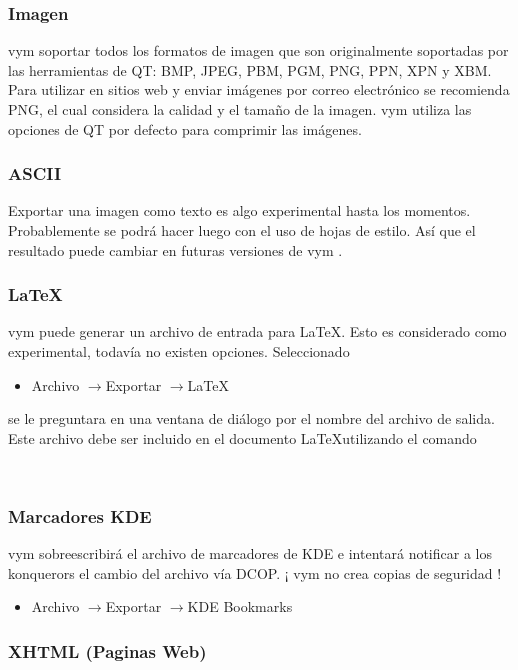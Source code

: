 \documentclass{article}
\newcommand{\vym}{{\sc vym }}
\newcommand{\ra}{$\longrightarrow$}
\begin{document}
\subsubsection*{Imagen}
\vym soportar todos los formatos de imagen que son originalmente soportadas por las herramientas de QT: BMP, JPEG, PBM, PGM, PNG, PPN, XPN y XBM. Para utilizar en sitios web y enviar im\'agenes por correo electr\'onico se recomienda PNG, el cual considera la calidad y el tama\~no de la imagen. \vym utiliza las opciones de QT por defecto para comprimir las im\'agenes.

\subsubsection*{ASCII}
    Exportar una imagen como texto es algo experimental hasta los momentos. Probablemente se podr\'a hacer luego con el uso de hojas de estilo. As\'i que el resultado puede cambiar en futuras versiones de \vym.

\subsubsection*{\LaTeX}
\vym puede generar un archivo de entrada para \LaTeX. Esto es considerado como experimental, todav\'ia no existen opciones. Seleccionado
\begin{itemize}
    \item   Archivo \ra Exportar \ra \LaTeX
\end{itemize}
    se le preguntara en una ventana de di\'alogo por el nombre del archivo de salida. Este archivo debe ser incluido en el documento \LaTeX utilizando el comando
\begin{verbatim}
    
\end{verbatim}

\subsubsection*{Marcadores KDE}
\vym sobreescribir\'a el archivo de marcadores de KDE e intentar\'a notificar a los konquerors el cambio del archivo v\'ia DCOP. 
¡ \vym no crea copias de seguridad !
\begin{itemize}
    \item Archivo \ra Exportar \ra KDE Bookmarks
\end{itemize}

\subsubsection*{XHTML (Paginas Web)}
\end{document}
